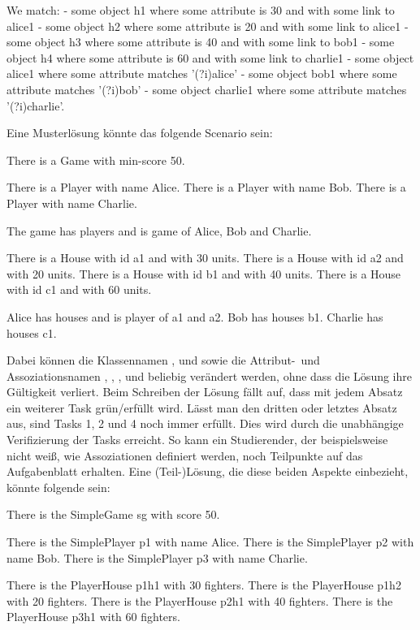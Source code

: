 \begin{itemize}
    \begin{mdcodeblock}
        We match:
        - some object h1 where some attribute is 30 and with some link to alice1
        - some object h2 where some attribute is 20 and with some link to alice1
        - some object h3 where some attribute is 40 and with some link to bob1
        - some object h4 where some attribute is 60 and with some link to charlie1
        - some object alice1 where some attribute matches '(?i)alice'
        - some object bob1 where some attribute matches '(?i)bob'
        - some object charlie1 where some attribute matches '(?i)charlie'.
    \end{mdcodeblock}
\end{itemize}

Eine Musterlösung könnte das folgende Scenario sein:

\begin{mdcodeblock}
    There is a Game with min-score 50.

    There is a Player with name Alice.
    There is a Player with name Bob.
    There is a Player with name Charlie.

    The game has players and is game of Alice, Bob and Charlie.

    There is a House with id a1 and with 30 units.
    There is a House with id a2 and with 20 units.
    There is a House with id b1 and with 40 units.
    There is a House with id c1 and with 60 units.

    Alice has houses and is player of a1 and a2.
    Bob has houses b1.
    Charlie has houses c1.
\end{mdcodeblock}

Dabei können die Klassennamen ,  und  sowie die Attribut-\ und Assoziationsnamen , , ,  und  beliebig verändert werden,
ohne dass die Lösung ihre Gültigkeit verliert.
Beim Schreiben der Lösung fällt auf, dass mit jedem Absatz ein weiterer Task grün/erfüllt wird.
Lässt man den dritten oder letztes Absatz aus, sind Tasks 1, 2 und 4 noch immer erfüllt.
Dies wird durch die unabhängige Verifizierung der Tasks erreicht.
So kann ein Studierender, der beispielsweise nicht weiß, wie Assoziationen definiert werden, noch Teilpunkte auf das Aufgabenblatt erhalten.
Eine (Teil-)Lösung, die diese beiden Aspekte einbezieht, könnte folgende sein:

\begin{mdcodeblock}
    There is the SimpleGame sg with score 50.

    There is the SimplePlayer p1 with name Alice.
    There is the SimplePlayer p2 with name Bob.
    There is the SimplePlayer p3 with name Charlie.

    There is the PlayerHouse p1h1 with 30 fighters.
    There is the PlayerHouse p1h2 with 20 fighters.
    There is the PlayerHouse p2h1 with 40 fighters.
    There is the PlayerHouse p3h1 with 60 fighters.
\end{mdcodeblock}
